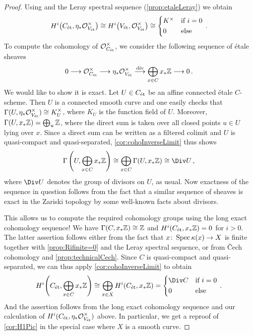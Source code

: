 \begin{proof}
	
	Using \itememph{*} and the Leray spectral sequence (\cref{prop:etaleLeray}) we obtain
	\begin{equation*}
		H^i\big(C_\et,\eta_*\Oo_{V_\et}^\times\big)\cong H^i\big(V_\et,\Oo_{V_\et}^\times\big)\cong\begin{cases*}
			K^\times & if $i=0$\\
			0 & else
		\end{cases*}\,.
	\end{equation*}
	To compute the cohomology of $\mathcal{O}_{C_{\mathrm{\acute{e}t}}}^\times$, we consider the following sequence of étale sheaves
	\begin{equation*}
		0\morphism \Oo_{C_\et}^\times\morphism \eta_*\Oo_{V_\et}^\times\morphism[\div]\bigoplus_{x\in C}x_*\IZ\morphism 0\,.
	\end{equation*}
	We would like to show it is exact. Let $U\in C_{\mathrm{\acute{e}t}}$ be an affine connected étale $C$-scheme. Then $U$ is a connected smooth curve and one easily checks that $\operatorname{\Gamma}(U,\eta_*\mathcal{O}_{V_{\mathrm{\acute{e}t}}}^\times)\cong K_U^\times$, where $K_U$ is the function field of $U$. Moreover, $\operatorname{\Gamma}(U,x_*\mathbb{Z})=\bigoplus_u\mathbb{Z}$, where the direct sum is taken over all closed points $u\in U$ lying over $x$. Since a direct sum can be written as a filtered colimit and $U$ is quasi-compact and quasi-separated, \cref{cor:cohoInverseLimit} thus shows 
	\begin{equation*}
		\Global\Bigg(U,\bigoplus_{x\in C}x_*\IZ\Bigg)\cong \bigoplus_{x\in C}\Global(U,x_*\IZ)\cong \Div U\,,
	\end{equation*}
	where $\Div U$ denotes the group of divisors on $U$, as usual. Now exactness of the sequence in question follows from the fact that a similar sequence of sheaves is exact in the Zariski topology by some well-known facts about divisors.
	
	
	This allows us to compute the required cohomology groups using the long exact cohomology sequence! We have $\operatorname{\Gamma}(C,x_*\mathbb{Z})\cong \mathbb{Z}$ and $H^i(C_{\mathrm{\acute{e}t}},x_*\mathbb{Z})=0$ for $i>0$. The latter assertion follows either from the fact that $x\colon \Spec \kappa(x)\morphism X$ is finite together with \cref{prop:Rifinite=0} and the Leray spectral sequence, or from \v Cech cohomology and \cref{prop:technicalCech}. Since $C$ is quasi-compact and quasi-separated, we can thus apply \cref{cor:cohoInverseLimit} to obtain 
	\begin{equation*}
		H^i\Bigg(C_\et,\bigoplus_{x\in C}x_*\IZ\Bigg)\cong \bigoplus_{x\in X}H^i(C_\et,x_*\IZ)=\begin{cases*}
			\Div C & if $i=0$\\
			0 & else
		\end{cases*}\,.
	\end{equation*}
	And the assertion follows from the long exact cohomology sequence and our calculation of $H^i(C_{\mathrm{\acute{e}t}},\eta_*\mathcal{O}_{V_{\mathrm{\acute{e}t}}}^\times)$ above. In particular, we get a reproof of \cref{cor:H1Pic} in the special case where $X$ is a smooth curve.
\end{proof}
